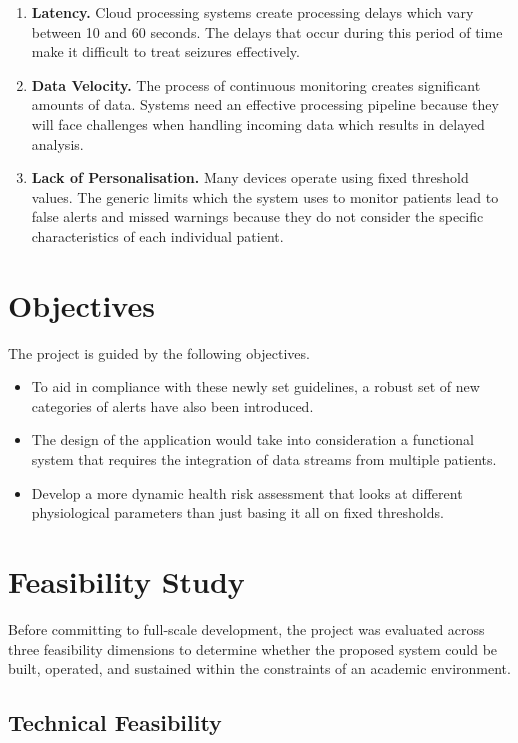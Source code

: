 \documentclass[12pt, a4paper, oneside]{report}
\begin{document}
\begin{enumerate}
    \item \textbf{Latency.} Cloud processing systems create processing delays which vary between 10 and 60 seconds. The delays that occur during this period of time make it difficult to treat seizures effectively.
    \item \textbf{Data Velocity.} The process of continuous monitoring creates significant amounts of data. Systems need an effective processing pipeline because they will face challenges when handling incoming data which results in delayed analysis.
    \item \textbf{Lack of Personalisation.} Many devices operate using fixed threshold values. The generic limits which the system uses to monitor patients lead to false alerts and missed warnings because they do not consider the specific characteristics of each individual patient.
\end{enumerate}

\section{Objectives}

The project is guided by the following objectives.

\begin{itemize}
    \item To aid in compliance with these newly set guidelines, a robust set of new categories of alerts have also been introduced.
    \item The design of the application would take into consideration a functional system that requires the integration of data streams from multiple patients.
    \item Develop a more dynamic health risk assessment that looks at different physiological parameters than just basing it all on fixed thresholds.
\end{itemize}

\section{Feasibility Study}

Before committing to full-scale development, the project was evaluated across three feasibility dimensions to determine whether the proposed system could be built, operated, and sustained within the constraints of an academic environment.

\subsection{Technical Feasibility}
\end{document}
